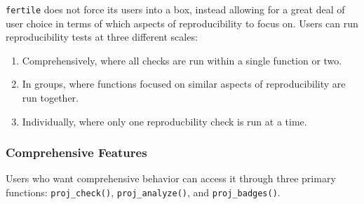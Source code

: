 \documentclass[12pt,twoside]{reedthesis}
\begin{document}
\texttt{fertile} does not force its users into a box, instead allowing for a great deal of user choice in terms of which aspects of reproducibility to focus on. Users can run reproducibility tests at three different scales:
\begin{enumerate}
\def\labelenumi{\arabic{enumi})}
\item
  Comprehensively, where all checks are run within a single function or two.
\item
  In groups, where functions focused on similar aspects of reproducibility are run together.
\item
  Individually, where only one reproducbility check is run at a time.
\end{enumerate}
\hypertarget{comprehensive-features}{%
\subsubsection{Comprehensive Features}\label{comprehensive-features}}

Users who want comprehensive behavior can access it through three primary functions: \texttt{proj\_check()}, \texttt{proj\_analyze()}, and \texttt{proj\_badges()}.
\end{document}
